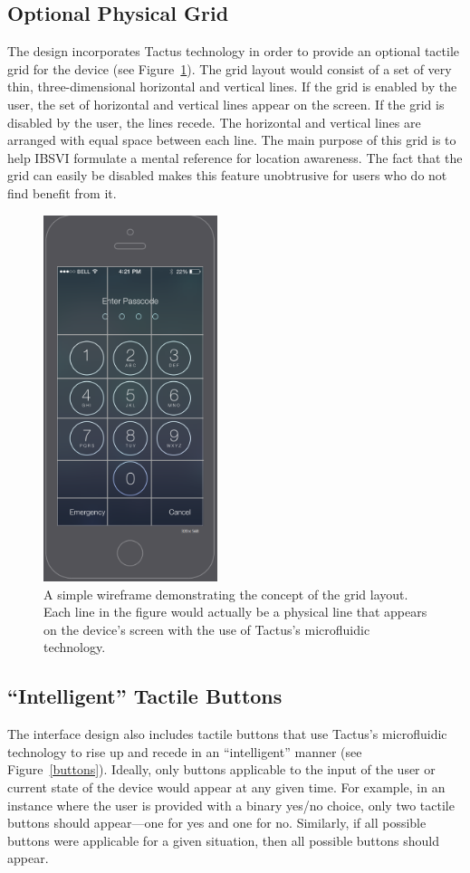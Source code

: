 \documentclass[11pt]{article}
\begin{document}
\subsection{Optional Physical Grid}
The design incorporates Tactus technology in order to provide an optional tactile grid for the device (see Figure~\ref{wireframe-grid}). The grid layout would consist of a set of very thin, three-dimensional horizontal and vertical lines. If the grid is enabled by the user, the set of horizontal and vertical lines appear on the screen. If the grid is disabled by the user, the lines recede. The horizontal and vertical lines are arranged with equal space between each line. The main purpose of this grid is to help IBSVI formulate a mental reference for location awareness. The fact that the grid can easily be disabled makes this feature unobtrusive for users who do not find benefit from it.


\begin{figure}[ht]
\centering
\includegraphics[width=2in]{wireframe-grid.png} 
\caption{A simple wireframe demonstrating the concept of the grid layout. Each line in the figure would actually be a physical line that appears on the device's screen with the use of Tactus's microfluidic technology.}
\label{wireframe-grid}
\end{figure}

\subsection{``Intelligent'' Tactile Buttons}
The interface design also includes tactile buttons that use Tactus's microfluidic technology to rise up and recede in an ``intelligent'' manner (see Figure~\ref{buttons}). Ideally, only buttons applicable to the input of the user or current state of the device would appear at any given time. For example, in an instance where the user is provided with a binary yes/no choice, only two tactile buttons should appear---one for yes and one for no. Similarly, if all possible buttons were applicable for a given situation, then all possible buttons should appear.
\end{document}
